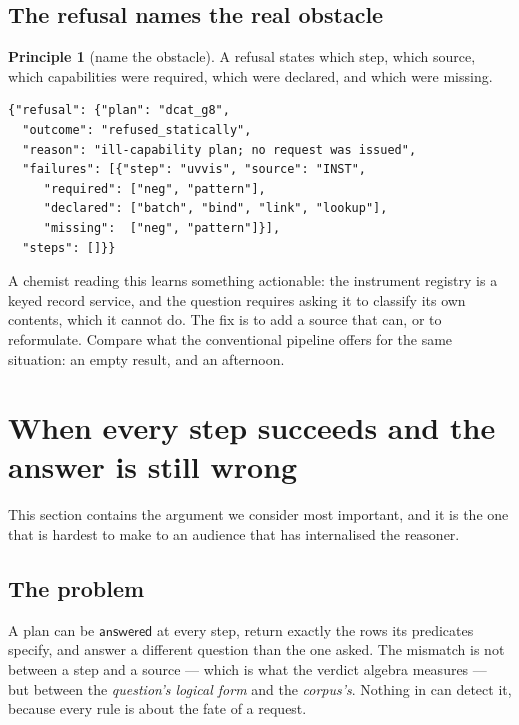 \documentclass[11pt,a4paper]{article}
\theoremstyle{plain}
\theoremstyle{definition}
\newtheorem{principle}[theorem]{Principle}
\theoremstyle{remark}
\newcommand{\vans}{\textsf{answered}}
\begin{document}
\subsection{The refusal names the real obstacle}

\begin{principle}[name the obstacle]
\label{prin:refusal}
A refusal states which step, which source, which capabilities were
required, which were declared, and which were missing.
\end{principle}

\begin{lstlisting}[style=hfq,caption={The emitted refusal for G8.
\texttt{requests\_issued} is 0.},label={lst:refusal}]
{"refusal": {"plan": "dcat_g8",
  "outcome": "refused_statically",
  "reason": "ill-capability plan; no request was issued",
  "failures": [{"step": "uvvis", "source": "INST",
     "required": ["neg", "pattern"],
     "declared": ["batch", "bind", "link", "lookup"],
     "missing":  ["neg", "pattern"]}],
  "steps": []}}
\end{lstlisting}

A chemist reading this learns something actionable: the instrument
registry is a keyed record service, and the question requires asking it
to classify its own contents, which it cannot do. The fix is to add a
source that can, or to reformulate. Compare what the conventional
pipeline offers for the same situation: an empty result, and an
afternoon.

\section{When every step succeeds and the answer is still wrong}
\label{sec:admissibility}

This section contains the argument we consider most important, and it is
the one that is hardest to make to an audience that has internalised the
reasoner.

\subsection{The problem}

A plan can be $\vans$ at every step, return exactly the rows its
predicates specify, and answer a different question than the one asked.
The mismatch is not between a step and a source --- which is what the
verdict algebra measures --- but between the \emph{question's logical
form} and the \emph{corpus's}. Nothing in  can detect
it, because every rule is about the fate of a request.
\end{document}
